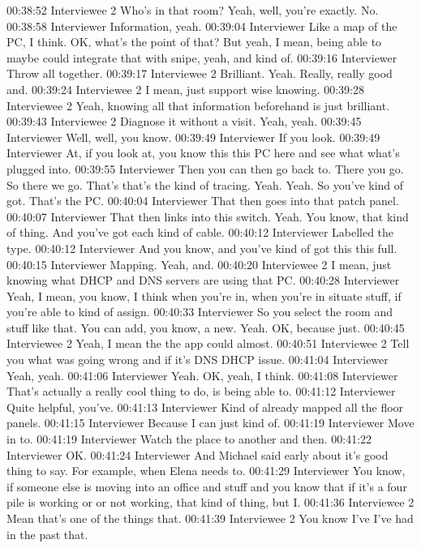 00:38:52 Interviewee 2 
Who's in that room? Yeah, well, you're exactly. No.
00:38:58 Interviewer
Information, yeah.
00:39:04 Interviewer
Like a map of the PC, I think. OK, what's the point of that? But yeah, I mean, being able to maybe could integrate that with snipe, yeah, and kind of.
00:39:16 Interviewer
Throw all together.
00:39:17 Interviewee 2 
Brilliant. Yeah. Really, really good and.
00:39:24 Interviewee 2 
I mean, just support wise knowing.
00:39:28 Interviewee 2 
Yeah, knowing all that information beforehand is just brilliant.
00:39:43 Interviewee 2 
Diagnose it without a visit. Yeah, yeah.
00:39:45 Interviewer
Well, well, you know.
00:39:49 Interviewer
If you look.
00:39:49 Interviewer
At, if you look at, you know this this PC here and see what what's plugged into.
00:39:55 Interviewer
Then you can then go back to. There you go. So there we go. That's that's the kind of tracing. Yeah. Yeah. So you've kind of got. That's the PC.
00:40:04 Interviewer
That then goes into that patch panel.
00:40:07 Interviewer
That then links into this switch. Yeah. You know, that kind of thing. And you've got each kind of cable.
00:40:12 Interviewer
Labelled the type.
00:40:12 Interviewer
And you know, and you've kind of got this this full.
00:40:15 Interviewer
Mapping. Yeah, and.
00:40:20 Interviewee 2 
I mean, just knowing what DHCP and DNS servers are using that PC.
00:40:28 Interviewer
Yeah, I mean, you know, I think when you're in, when you're in situate stuff, if you're able to kind of assign.
00:40:33 Interviewer
So you select the room and stuff like that. You can add, you know, a new. Yeah. OK, because just.
00:40:45 Interviewee 2 
Yeah, I mean the the app could almost.
00:40:51 Interviewee 2 
Tell you what was going wrong and if it's DNS DHCP issue.
00:41:04 Interviewer
Yeah, yeah.
00:41:06 Interviewer
Yeah. OK, yeah, I think.
00:41:08 Interviewer
That's actually a really cool thing to do, is being able to.
00:41:12 Interviewer
Quite helpful, you've.
00:41:13 Interviewer
Kind of already mapped all the floor panels.
00:41:15 Interviewer
Because I can just kind of.
00:41:19 Interviewer
Move in to.
00:41:19 Interviewer
Watch the place to another and then.
00:41:22 Interviewer
OK.
00:41:24 Interviewer
And Michael said early about it's good thing to say. For example, when Elena needs to.
00:41:29 Interviewer
You know, if someone else is moving into an office and stuff and you know that if it's a four pile is working or or not working, that kind of thing, but I.
00:41:36 Interviewee 2 
Mean that's one of the things that.
00:41:39 Interviewee 2 
You know I've I've had in the past that.
